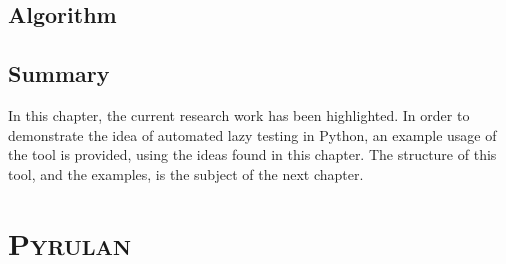 \documentclass{icldt}
\numberwithin{equation}{section}       %
\begin{document}
\section{Algorithm}
\section{Summary}
In this chapter, the current research work has been highlighted. In order to demonstrate the idea of automated lazy testing in Python, an example usage of the tool is provided, using the ideas found in this chapter. The structure of this tool, and the examples, is the subject of the next chapter.
\chapter{\textsc{Pyrulan}}
\label{ch:pyrulan}
\end{document}
